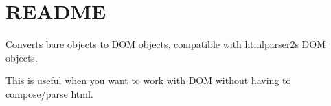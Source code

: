 \chapter{README}
\hypertarget{md_node__modules_2dom-converter_2README}{}\label{md_node__modules_2dom-converter_2README}
Converts bare objects to DOM objects, compatible with htmlparser2\textquotesingle{}s DOM objects.

This is useful when you want to work with DOM without having to compose/parse html. 
